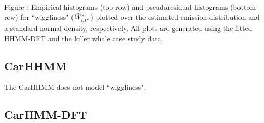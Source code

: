 \documentclass{article}
\begin{document}
        \noindent Figure : Empirical histograms (top row) and pseudoresidual histograms (bottom row) for ``wiggliness" ($\tilde{W}^*_{t,\tilde t^*}$) plotted over the estimated emission distribution and a standard normal density, respectively. All plots are generated using the fitted HHMM-DFT and the killer whale case study data.
        \addtocounter{fignum}{1}
        
        \subsection{CarHHMM}
        
        The CarHHMM does not model ``wiggliness".
        
        \subsection{CarHMM-DFT}
        
\end{document}
